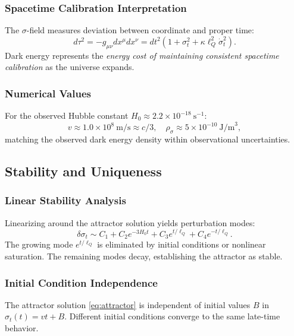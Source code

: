 \documentclass[11pt,a4paper]{article}
\theoremstyle{definition}
\theoremstyle{remark}
\begin{document}
	\subsubsection{Spacetime Calibration Interpretation}
	The $\sigma$-field measures deviation between coordinate and proper time:
	\[
	d\tau^2 = -g_{\mu\nu} dx^\mu dx^\nu = dt^2 \left(1 + \sigma_t^2 + \kappa \ell_Q^2 \dot{\sigma}_t^2\right).
	\]
	Dark energy represents the \emph{energy cost of maintaining consistent spacetime calibration} as the universe expands.
	
	\subsubsection{Numerical Values}
	For the observed Hubble constant $H_0 \approx 2.2 \times 10^{-18} \ \text{s}^{-1}$:
	\[
	v \approx 1.0 \times 10^8 \ \text{m/s} \approx c/3, \quad \rho_\sigma \approx 5 \times 10^{-10} \ \text{J/m}^3,
	\]
	matching the observed dark energy density within observational uncertainties.
	
	\subsection{Stability and Uniqueness}
	
	\subsubsection{Linear Stability Analysis}
	Linearizing around the attractor solution yields perturbation modes:
	\begin{equation}
		\delta\sigma_t \sim C_1 + C_2 e^{-3H_0 t} + C_3 e^{t/\ell_Q} + C_4 e^{-t/\ell_Q}.
		\label{eq:perturbations}
	\end{equation}
	The growing mode $e^{t/\ell_Q}$ is eliminated by initial conditions or nonlinear saturation. The remaining modes decay, establishing the attractor as stable.
	
	\subsubsection{Initial Condition Independence}
	The attractor solution \eqref{eq:attractor} is independent of initial values $B$ in $\sigma_t(t) = vt + B$. Different initial conditions converge to the same late-time behavior.
	
\end{document}
